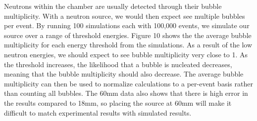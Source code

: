 \documentclass[%
12pt,
twoside,
reprint,
amsmath,amssymb,
aps,
]{article}
\begin{document}
	\par Neutrons within the chamber are usually detected through their bubble multiplicity. With a neutron source, we would then expect see multiple bubbles per event. By running 100 simulations each with 100,000 events, we simulate our source over a range of threshold energies. Figure 10 shows the the average bubble multiplicity for each energy threshold from the simulations. As a result of the low neutron energies, we should expect to see bubble multiplicity very close to 1. As the threshold increases, the likelihood that a bubble is nucleated decreases, meaning that the bubble multiplicity should also decrease. The average bubble multiplicity can then be used to normalize calculations to a per-event basis rather than counting all bubbles. The 60mm data also shows that there is high error in the results compared to 18mm, so placing the source at 60mm will make it difficult to match experimental results with simulated results.
	
\end{document}
